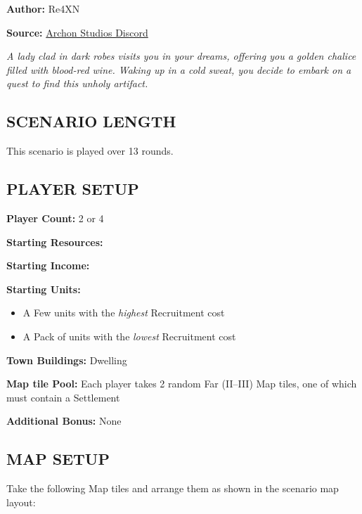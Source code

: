 
\begin{multicols*}{2}

\textbf{Author:} Re4XN

\textbf{Source:} \href{https://discord.com/channels/740870068178649108/1239631918643941509}{Archon Studios Discord}

\textit{A lady clad in dark robes visits you in your dreams, offering you a golden chalice filled with blood-red wine. Waking up in a cold sweat, you decide to embark on a quest to find this unholy artifact.}

\subsection*{\MakeUppercase{Scenario Length}}
This scenario is played over 13 rounds.

\subsection*{\MakeUppercase{Player Setup}}
\textbf{Player Count:} 2 or 4

\textbf{Starting Resources:}\par
{}

\textbf{Starting Income:}\par
{}

\textbf{Starting Units:}
\begin{itemize}
  \item A Few  units with the \textit{highest} Recruitment cost
  \item A Pack of  units with the \textit{lowest} Recruitment cost
\end{itemize}

\textbf{Town Buildings:}  Dwelling

\textbf{Map tile Pool:} Each player takes 2 random Far (II--III) Map tiles, one of which must contain a Settlement

\textbf{Additional Bonus:} None

\subsection*{\MakeUppercase{Map Setup}}
Take the following Map tiles and arrange them as shown in the scenario map layout:


\end{multicols*}

